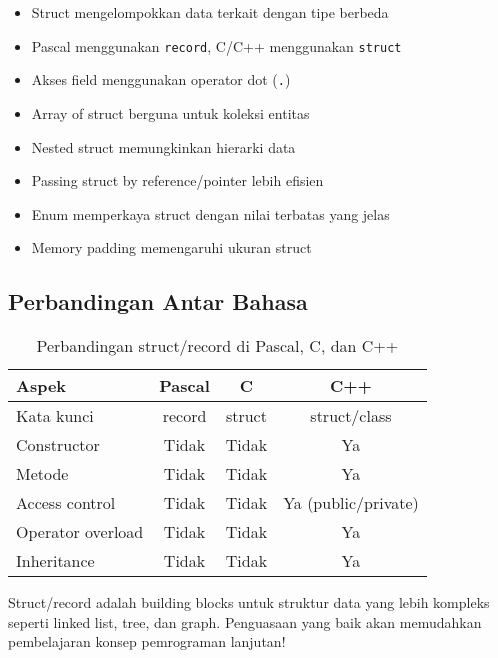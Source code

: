 \documentclass[../main.tex]{subfiles}
\begin{document}
\begin{itemize}
  \item Struct mengelompokkan data terkait dengan tipe berbeda
  \item Pascal menggunakan \texttt{record}, C/C++ menggunakan \texttt{struct}
  \item Akses field menggunakan operator dot (\texttt{.})
  \item Array of struct berguna untuk koleksi entitas
  \item Nested struct memungkinkan hierarki data
  \item Passing struct by reference/pointer lebih efisien
  \item Enum memperkaya struct dengan nilai terbatas yang jelas
  \item Memory padding memengaruhi ukuran struct
\end{itemize}

\subsection{Perbandingan Antar Bahasa}

\begin{table}[H]
\centering
\begin{tabular}{|l|c|c|c|}
\hline
\textbf{Aspek} & \textbf{Pascal} & \textbf{C} & \textbf{C++} \\
\hline
Kata kunci & record & struct & struct/class \\
\hline
Constructor & Tidak & Tidak & Ya \\
\hline
Metode & Tidak & Tidak & Ya \\
\hline
Access control & Tidak & Tidak & Ya (public/private) \\
\hline
Operator overload & Tidak & Tidak & Ya \\
\hline
Inheritance & Tidak & Tidak & Ya \\
\hline
\end{tabular}
\caption{Perbandingan struct/record di Pascal, C, dan C++}
\end{table}

Struct/record adalah building blocks untuk struktur data yang lebih kompleks seperti linked list, tree, dan graph. Penguasaan yang baik akan memudahkan pembelajaran konsep pemrograman lanjutan!
\end{document}
